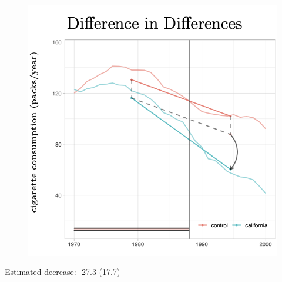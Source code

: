 \documentclass{beamer}
\begin{document}
\begin{frame}[plain]

	\begin{figure}
	\includegraphics[scale=0.65]{./lecture_includes/sdid_2.png}
	\end{figure}
	
Estimated decrease: -27.3 (17.7)

\end{frame}
\end{document}
